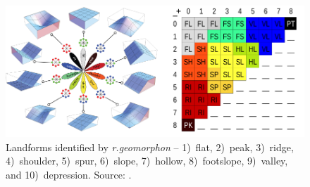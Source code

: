 \documentclass[prodmode,acmtochi]{acmsmall} %
\begin{document}
\begin{figure}
\begin{center}
		\includegraphics[width=\textwidth]{images/geomorphons_legend.png}
	\caption{Landforms identified by \textit{r.geomorphon} --
		1)~flat, 
		2)~peak, 
		3)~ridge, 
		4)~shoulder, 
		5)~spur, 
		6)~slope, 
		7)~hollow, 
		8)~footslope, 
		9)~valley, and
		10)~depression.
		Source: \cite{r.geomorphon}.}
	\label{fig:geomorphons}
\end{center}
\end{figure}

% 
%

\end{document}
